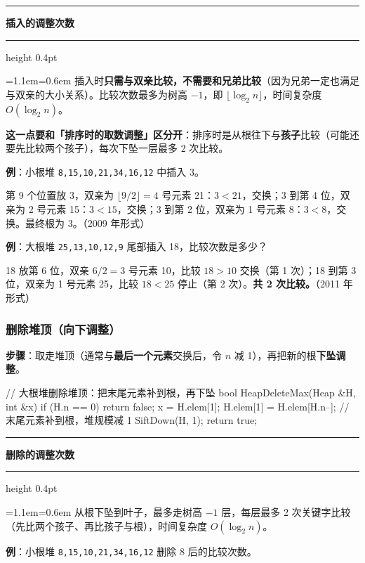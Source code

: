 \documentclass[11pt,openany,UTF8]{ctexbook}
\newcommand{\callouthead}[2]{%
  \par\addvspace{7pt}\noindent
  {\color{#1}\rule[-0.15em]{3pt}{1.05em}}\hspace{0.5em}%
  {\bfseries\color{#1}#2}\par\nobreak\vspace{-0.35em}%
  {\color{rulesep}\hrule height 0.4pt}\nobreak\vspace{0.45em}%
  \begingroup\small\setlength{\parindent}{0pt}%
  \leftskip=1.1em\rightskip=0.6em\noindent\ignorespaces}
\newcommand{\calloutend}{\par\endgroup\addvspace{7pt}}
\newenvironment{callkey}[1]{\callouthead{keybar}{#1}}{\calloutend}
\begin{document}
\begin{callkey}{插入的调整次数}
插入时\textbf{只需与双亲比较，不需要和兄弟比较}（因为兄弟一定也满足与双亲的大小关系）。比较次数最多为树高 $-1$，即 $\lfloor\log_2 n\rfloor$，时间复杂度 $O(\log_2 n)$。

\textbf{这一点要和「排序时的取数调整」区分开}：排序时是从根往下与\textbf{孩子}比较（可能还要先比较两个孩子），每次下坠一层最多 2 次比较。

\end{callkey}

\textbf{例}：小根堆 \texttt{8,\allowbreak{}15,\allowbreak{}10,\allowbreak{}21,\allowbreak{}34,\allowbreak{}16,\allowbreak{}12} 中插入 3。

第 9 个位置放 3，双亲为 $\lfloor9/2\rfloor=4$ 号元素 21：$3<21$，交换；3 到第 4 位，双亲为 2 号元素 15：$3<15$，交换；3 到第 2 位，双亲为 1 号元素 8：$3<8$，交换。最终根为 3。（2009 年形式）

\textbf{例}：大根堆 \texttt{25,\allowbreak{}13,\allowbreak{}10,\allowbreak{}12,\allowbreak{}9} 尾部插入 18，比较次数是多少？

18 放第 6 位，双亲 $6/2=3$ 号元素 10，比较 $18>10$ 交换（第 1 次）；18 到第 3 位，双亲为 1 号元素 25，比较 $18<25$ 停止（第 2 次）。\textbf{共 2 次比较。}（2011 年形式）

\subsubsection{删除堆顶（向下调整）}

\textbf{步骤}：取走堆顶（通常与\textbf{最后一个元素}交换后，令 $n$ 减 1），再把新的根\textbf{下坠调整}。

\begin{codebox}
// 大根堆删除堆顶：把末尾元素补到根，再下坠
bool HeapDeleteMax(Heap &H, int &x) {
    if (H.n == 0) return false;
    x = H.elem[1];
    H.elem[1] = H.elem[H.n--];   // 末尾元素补到根，堆规模减 1
    SiftDown(H, 1);
    return true;
}
\end{codebox}

\begin{callkey}{删除的调整次数}
从根下坠到叶子，最多走树高 $-1$ 层，每层最多 2 次关键字比较（先比两个孩子、再比孩子与根），时间复杂度 $O(\log_2 n)$。

\end{callkey}

\textbf{例}：小根堆 \texttt{8,\allowbreak{}15,\allowbreak{}10,\allowbreak{}21,\allowbreak{}34,\allowbreak{}16,\allowbreak{}12} 删除 8 后的比较次数。
\end{document}
